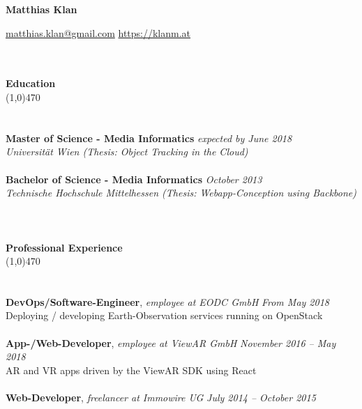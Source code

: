 \documentclass[10pt]{article} %
\begin{document}
\centerline{{\LARGE \bf Matthias Klan}}
\centerline{\href{mailto:matthias.klan@gmail.com}{matthias.klan@gmail.com} \raisebox{0.25ex}{\tiny$\bullet$} \href{https://klanm.at}{https://klanm.at}}

\noindent %
\\\\
{\Large \bf Education}\\
\line(1,0){470}\\
\\\\
\noindent
{\bf Master of Science - Media Informatics} \hfill \textit{expected by June 2018} \\ 
\textit{Universität Wien (Thesis: Object Tracking in the Cloud)}\\\\
\noindent
{\bf Bachelor of Science - Media Informatics} \hfill \textit{October 2013} \\
\textit{Technische Hochschule Mittelhessen (Thesis: Webapp-Conception using Backbone)}\\
\\
\noindent %
\\\\
{\Large \bf Professional Experience}\\
\line(1,0){470}\\
\\\\
\noindent
{\bf DevOps/Software-Engineer}, \textit{employee at EODC GmbH}  \hfill \textit{ From May 2018 } \\ 
Deploying / developing Earth-Observation services running on OpenStack\\\\
\noindent
\noindent
{\bf App-/Web-Developer}, \textit{employee at ViewAR GmbH}  \hfill \textit{ November 2016 -- May 2018 } \\ 
AR and VR apps driven by the ViewAR SDK using React\\\\
\noindent
{\bf Web-Developer}, \textit{freelancer at Immowire UG}  \hfill \textit{ July 2014 -- October 2015 } \\ 
\end{document}
